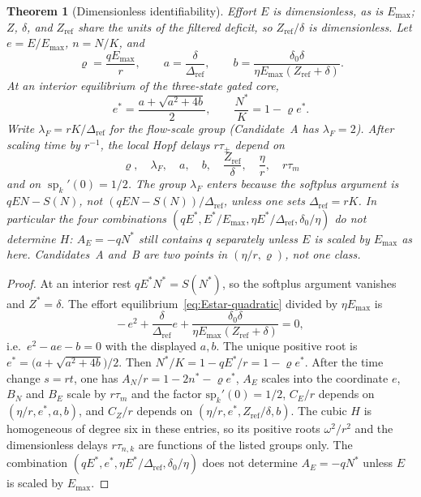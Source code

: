 \documentclass[11pt]{article}
\newtheorem{theorem}{Theorem}
\theoremstyle{definition}
\begin{document}
\begin{theorem}[Dimensionless identifiability]
\label{thm:ident}
Effort $E$ is dimensionless, as is $E_{\max}$; $Z$, $\delta$, and $Z_{\mathrm{ref}}$ share the units of the filtered deficit, so $Z_{\mathrm{ref}}/\delta$ is dimensionless. Let $e=E/E_{\max}$, $n=N/K$, and
\[
\varrho=\frac{qE_{\max}}{r},\qquad
a=\frac{\delta}{\Delta_{\mathrm{ref}}},\qquad
b=\frac{\delta_0\delta}{\eta E_{\max}(Z_{\mathrm{ref}}+\delta)}.
\]
At an interior equilibrium of the three-state gated core,
\[
e^*=\frac{a+\sqrt{a^2+4b}}{2},\qquad
\frac{N^*}{K}=1-\varrho e^*.
\]
Write $\lambda_F=rK/\Delta_{\mathrm{ref}}$ for the flow-scale group (Candidate~A has $\lambda_F=2$). After scaling time by $r^{-1}$, the local Hopf delays $r\tau_\pm$ depend on
\[
\varrho,\quad \lambda_F,\quad a,\quad b,\quad \frac{Z_{\mathrm{ref}}}{\delta},\quad \frac{\eta}{r},\quad r\tau_m
\]
and on $\operatorname{sp}_k'(0)=1/2$. The group $\lambda_F$ enters because the softplus argument is $qEN-S(N)$, not $(qEN-S(N))/\Delta_{\mathrm{ref}}$, unless one sets $\Delta_{\mathrm{ref}}=rK$. In particular the four combinations $(qE^*,E^*/E_{\max},\eta E^*/\Delta_{\mathrm{ref}},\delta_0/\eta)$ do \emph{not} determine $H$: $A_E=-qN^*$ still contains $q$ separately unless $E$ is scaled by $E_{\max}$ as here. Candidates~A and~B are two points in $(\eta/r,\varrho)$, not one class.
\end{theorem}

\begin{proof}
At an interior rest $qE^*N^*=S(N^*)$, so the softplus argument vanishes and $Z^*=\delta$. The effort equilibrium~\eqref{eq:Estar-quadratic} divided by $\eta E_{\max}$ is
\[
-\,e^2+\frac{\delta}{\Delta_{\mathrm{ref}}}e+\frac{\delta_0\delta}{\eta E_{\max}(Z_{\mathrm{ref}}+\delta)}=0,
\]
i.e.\ $e^2-ae-b=0$ with the displayed $a,b$. The unique positive root is $e^*=\bigl(a+\sqrt{a^2+4b}\bigr)/2$. Then $N^*/K=1-qE^*/r=1-\varrho e^*$. After the time change $s=rt$, one has $A_N/r=1-2n^*-\varrho e^*$, $A_E$ scales into the coordinate $e$, $B_N$ and $B_E$ scale by $r\tau_m$ and the factor $\mathrm{sp}_k'(0)=1/2$, $C_E/r$ depends on $(\eta/r,e^*,a,b)$, and $C_Z/r$ depends on $(\eta/r,e^*,Z_{\mathrm{ref}}/\delta,b)$. The cubic $H$ is homogeneous of degree six in these entries, so its positive roots $\omega^2/r^2$ and the dimensionless delays $r\tau_{n,k}$ are functions of the listed groups only. The combination $(qE^*,e^*,\eta E^*/\Delta_{\mathrm{ref}},\delta_0/\eta)$ does not determine $A_E=-qN^*$ unless $E$ is scaled by $E_{\max}$.
\end{proof}
\end{document}
